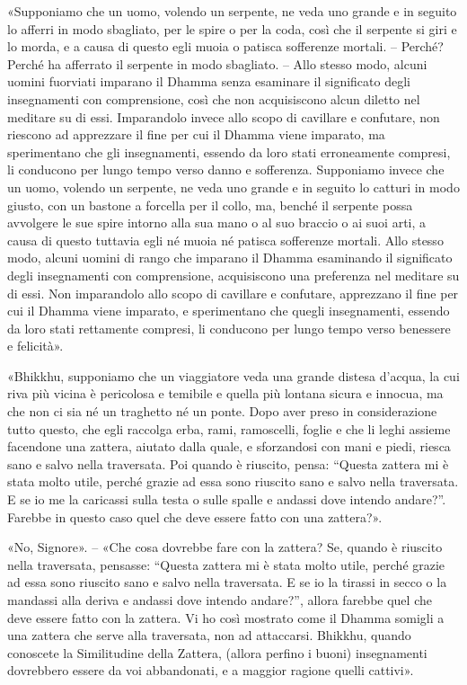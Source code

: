 «Supponiamo che un uomo, volendo un serpente, ne veda uno grande e in seguito lo
afferri in modo sbagliato, per le spire o per la coda, così che il serpente si
giri e lo morda, e a causa di questo egli muoia o patisca sofferenze mortali. –
Perché? Perché ha afferrato il serpente in modo sbagliato. – Allo stesso modo,
alcuni uomini fuorviati imparano il Dhamma senza esaminare il significato degli
insegnamenti con comprensione, così che non acquisiscono alcun diletto nel
meditare su di essi. Imparandolo invece allo scopo di cavillare e confutare, non
riescono ad apprezzare il fine per cui il Dhamma viene imparato, ma sperimentano
che gli insegnamenti, essendo da loro stati erroneamente compresi, li conducono
per lungo tempo verso danno e sofferenza. Supponiamo invece che un uomo, volendo
un serpente, ne veda uno grande e in seguito lo catturi in modo giusto, con un
bastone a forcella per il collo, ma, benché il serpente possa avvolgere le sue
spire intorno alla sua mano o al suo braccio o ai suoi arti, a causa di questo
tuttavia egli né muoia né patisca sofferenze mortali. Allo stesso modo, alcuni
uomini di rango che imparano il Dhamma esaminando il significato degli
insegnamenti con comprensione, acquisiscono una preferenza nel meditare su di
essi. Non imparandolo allo scopo di cavillare e confutare, apprezzano il fine
per cui il Dhamma viene imparato, e sperimentano che quegli insegnamenti,
essendo da loro stati rettamente compresi, li conducono per lungo tempo verso
benessere e felicità».

«Bhikkhu, supponiamo che un viaggiatore veda una grande distesa d’acqua, la cui
riva più vicina è pericolosa e temibile e quella più lontana sicura e innocua,
ma che non ci sia né un traghetto né un ponte. Dopo aver preso in considerazione
tutto questo, che egli raccolga erba, rami, ramoscelli, foglie e che li leghi
assieme facendone una zattera, aiutato dalla quale, e sforzandosi con mani e
piedi, riesca sano e salvo nella traversata. Poi quando è riuscito, pensa:
“Questa zattera mi è stata molto utile, perché grazie ad essa sono riuscito sano
e salvo nella traversata. E se io me la caricassi sulla testa o sulle spalle e
andassi dove intendo andare?”. Farebbe in questo caso quel che deve essere fatto
con una zattera?».

«No, Signore». – «Che cosa dovrebbe fare con la zattera? Se, quando è riuscito
nella traversata, pensasse: “Questa zattera mi è stata molto utile, perché
grazie ad essa sono riuscito sano e salvo nella traversata. E se io la tirassi
in secco o la mandassi alla deriva e andassi dove intendo andare?”, allora
farebbe quel che deve essere fatto con la zattera. Vi ho così mostrato come il
Dhamma somigli a una zattera che serve alla traversata, non ad attaccarsi.
Bhikkhu, quando conoscete la Similitudine della Zattera, (allora perfino i
buoni) insegnamenti dovrebbero essere da voi abbandonati, e a maggior ragione
quelli cattivi».


